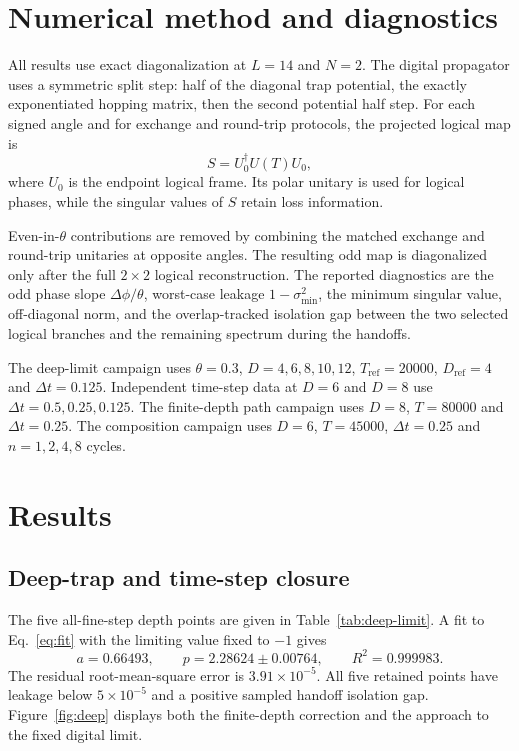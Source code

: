 \documentclass[11pt]{article}
\begin{document}
\section{Numerical method and diagnostics}

All results use exact diagonalization at $L=14$ and $N=2$. The digital
propagator uses a symmetric split step: half of the diagonal trap potential,
the exactly exponentiated hopping matrix, then the second potential half
step. For each signed angle and for exchange and round-trip protocols, the
projected logical map is
\begin{equation}
 S=U_0^\dagger U(T)U_0,
\end{equation}
where $U_0$ is the endpoint logical frame. Its polar unitary is used for
logical phases, while the singular values of $S$ retain loss information.

Even-in-$\theta$ contributions are removed by combining the matched exchange
and round-trip unitaries at opposite angles. The resulting odd map is
diagonalized only after the full $2\times2$ logical reconstruction. The
reported diagnostics are the odd phase slope $\Delta\phi/\theta$, worst-case
leakage $1-\sigma_{\min}^2$, the minimum singular value, off-diagonal norm,
and the overlap-tracked isolation gap between the two selected logical
branches and the remaining spectrum during the handoffs.

The deep-limit campaign uses $\theta=0.3$, $D=4,6,8,10,12$,
$T_\mathrm{ref}=20000$, $D_\mathrm{ref}=4$ and $\Delta t=0.125$. Independent
time-step data at $D=6$ and $D=8$ use $\Delta t=0.5,0.25,0.125$. The
finite-depth path campaign uses $D=8$, $T=80000$ and $\Delta t=0.25$.
The composition campaign uses $D=6$, $T=45000$, $\Delta t=0.25$ and
$n=1,2,4,8$ cycles.

\section{Results}

\subsection{Deep-trap and time-step closure}

The five all-fine-step depth points are given in Table~\ref{tab:deep-limit}.
A fit to Eq.~\eqref{eq:fit} with the limiting value fixed to $-1$ gives
\begin{equation}
 a=0.66493,\qquad p=2.28624\pm0.00764,\qquad R^2=0.999983 .
\end{equation}
The residual root-mean-square error is $3.91\times10^{-5}$. All five retained
points have leakage below $5\times10^{-5}$ and a positive sampled handoff
isolation gap. Figure~\ref{fig:deep} displays both the finite-depth correction
and the approach to the fixed digital limit.
\end{document}
